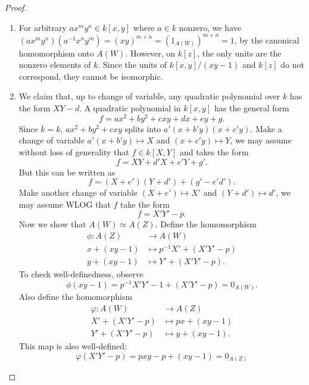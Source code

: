 \begin{enumerate}
\begin{proof}
\begin{enumerate}
					Now
					\[
						\phi \circ \varphi (t) = \phi(x) = t
					.\] 
					and similarly
					\[
						\varphi \circ \phi(x) = \varphi(t) = x,
						\varphi \circ \phi(y) = \varphi(t^2) = x^2 \equiv y \mod (y-x^2)
					.\] 
					Hence
					\[
						\phi \circ \varphi = \text{Id}, \varphi \circ \phi = \text{Id}
					.\] 
					Therefore the two sides are isomorphic.
				\item
					For arbitrary $a x^m y^n \in k[x,y]$ where $a \in k$ nonzero, we have \\$(a x^m y^n)(a^{-1} x^n y^m) = (xy)^{m + n} = \left(1_{A(W)}\right)^{m+n} = 1$, by the canonical homomorphism onto $A(W)$. However, on $k[z]$, the only units are the nonzero elements of $k$. Since the units of $k[x,y] / (xy - 1)$ and $k[z]$ do not correspond, they cannot be isomorphic.
				\item
					We claim that, up to change of variable, any quadratic polynomial over $k$ has the form $XY - d$.
					A quadratic polynomial in $k[x,y]$ has the general form
					\[
						f = a x^2 + b y^2 + c x y + d x + e y + g
					.\]  
					Since $\overline{k}  = k$, $ax^2 + by^2 + cxy$ splits into $a'(x+b'y)(x+c'y)$. Make a change of variable $a' (x + b'y) \mapsto X$ and $(x + c'y) \mapsto Y$, we may assume without loss of generality that $f \in k[X,Y]$  and takes the form
					\[
						f = XY + d'X + e'Y + g'
					.\] 
					But this can be written as
					\[
						f = (X + e')(Y + d') + (g' - e'd')
					.\] 
					Make another change of variable $(X + e') \mapsto X'$ and $(Y + d') \mapsto d'$, we may assume WLOG that $f$ take the form
					\[
						 f = X'Y' - p
					.\] 
					Now we show that $A(W) \simeq A(Z)$.
					Define the homomorphism
					\begin{align*}
						\phi: A(Z) &\longrightarrow A(W) \\
						x + (xy-1) &\mapsto p^{-1} X' + (X'Y'-p) \\
						y + (xy-1) &\mapsto Y' + (X'Y'-p)
					.\end{align*}
					To check well-definedness, observe
					\[
						\phi(xy - 1) = p^{-1}X'Y' - 1 + (X' Y' - p) = 0_{A(W)}
					.\] 
					Also define the homomorphism
					\begin{align*}
						\varphi: A(W) &\longrightarrow A(Z) \\
						X' + (X'Y' - p) &\longmapsto p x + (xy-1) \\
						Y' + (X'Y' - p) &\longmapsto y + (xy-1)
					.\end{align*}
					This map is also well-defined:
					\[
						\varphi(X'Y'-p) = pxy - p + (xy-1) = 0_{A(Z)}
\]
\end{enumerate}
\end{proof}
\end{enumerate}
